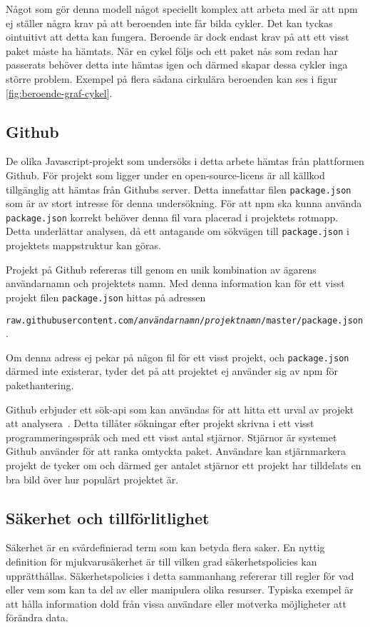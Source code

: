 Något som gör denna modell något speciellt komplex att arbeta med är att npm ej ställer några krav på att beroenden inte får bilda cykler. Det kan tyckas ointuitivt att detta kan fungera. Beroende är dock endast krav på att ett visst paket måste ha hämtats. När en cykel följs och ett paket nås som redan har passerats behöver detta inte hämtas igen och därmed skapar dessa cykler inga större problem. Exempel på flera sådana cirkulära beroenden kan ses i figur \ref{fig:beroende-graf-cykel}.

\subsection{Github}
\label{subsec:joel_o-github}
De olika Javascript-projekt som undersöks i detta arbete hämtas från plattformen Github. För projekt som ligger under en open-source-licens är all källkod tillgänglig att hämtas från Githubs server. Detta innefattar filen \texttt{package.json} som är av stort intresse för denna undersökning. För att npm ska kunna använda \texttt{package.json} korrekt behöver denna fil vara placerad i projektets rotmapp. Detta underlättar analysen, då ett antagande om sökvägen till \texttt{package.json} i projektets mappstruktur kan göras.

Projekt på Github refereras till genom en unik kombination av ägarens användarnamn och projektets namn. Med denna information kan för ett visst projekt filen \texttt{package.json} hittas på adressen

\texttt{raw.githubusercontent.com/\textit{användarnamn}/\textit{projektnamn}/master/package.json}.

Om denna adress ej pekar på någon fil för ett visst projekt, och \texttt{package.json} därmed inte existerar, tyder det på att projektet ej använder sig av npm för pakethantering.

Github erbjuder ett sök-api som kan användas för att hitta ett urval av projekt att analysera~\cite{github-api}. Detta tillåter sökningar efter projekt skrivna i ett visst programmeringsspråk och med ett visst antal stjärnor. Stjärnor är systemet Github använder för att ranka omtyckta paket. Användare kan stjärnmarkera projekt de tycker om och därmed ger antalet stjärnor ett projekt har tilldelats en bra bild över hur populärt projektet är.

\subsection{Säkerhet och tillförlitlighet}
Säkerhet är en svårdefinierad term som kan betyda flera saker. En nyttig definition för mjukvarusäkerhet är till vilken grad säkerhetspolicies kan upprätthållas. Säkerhetspolicies i detta sammanhang refererar till regler för vad eller vem som kan ta del av eller manipulera olika resurser. Typiska exempel är att hålla information dold från vissa användare eller motverka möjligheter att förändra data. \cite{secure-software}

